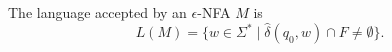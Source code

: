 

\setcounter{section}{1}
\setcounter{subsection}{4}
\setcounter{dfn}{14}

\begin{dfn}
The language accepted by an $\epsilon$-NFA $M$ is
\[
L(M) = \{w \in \Sigma^* \mid \widehat{\delta}(q_0, w) \cap F \ne \emptyset\}.
\]
\end{dfn}


